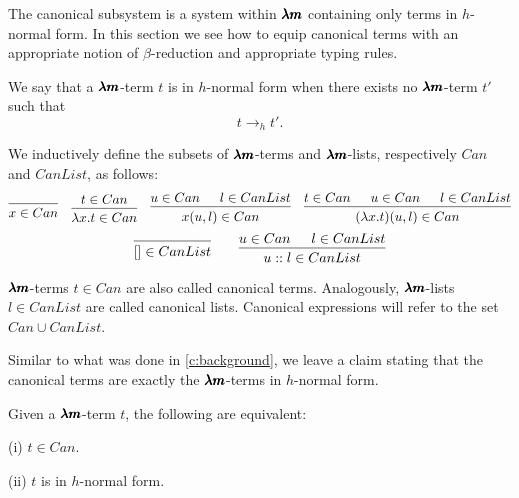 The canonical subsystem is a system within $\pmb{\lambda m}$ containing only terms in $h$-normal form.
In this section we see how to equip canonical terms with an appropriate notion of $\beta$-reduction and appropriate typing rules.

\begin{definition}
  We say that a $\pmb{\lambda m}$-term $t$ is in $h$-normal form when there exists no $\pmb{\lambda m}$-term $t'$ such that \[ t \to_h t' . \]
\end{definition}

\begin{definition}
  \label{canonical_terms}
  We inductively define the subsets of $\pmb{\lambda m}$-terms and $\pmb{\lambda m}$-lists, respectively $Can$ and $CanList$, as follows:
  \[
    \begin{prooftree}
      \infer0{ x \in Can } 
    \end{prooftree}
    \quad
    \begin{prooftree}
      \hypo{ t \in Can }
      \infer1{ \lambda x . t \in Can } 
    \end{prooftree}
    \quad
    \begin{prooftree}
      \hypo{ u \in Can }            
      \hypo{ l \in CanList }
      \infer2{ x(u, l) \in Can }
    \end{prooftree}
    \quad
    \begin{prooftree}
      \hypo{ t \in Can } 
      \hypo{ u \in Can }            
      \hypo{ l \in CanList }
      \infer3{ (\lambda x. t)(u, l) \in Can }
    \end{prooftree}
  \]
  \[
    \begin{prooftree}
      \infer0{ [] \in CanList } 
    \end{prooftree}
    \qquad
    \begin{prooftree}
      \hypo{ u \in Can }            
      \hypo{ l \in CanList }
      \infer2{ u::l \in CanList }
    \end{prooftree}
  \]

  $\pmb{\lambda m}$-terms $t \in Can$ are also called canonical terms.
  Analogously, $\pmb{\lambda m}$-lists $l \in CanList$ are called canonical lists.
  Canonical expressions will refer to the set $Can \cup CanList$.
\end{definition}

Similar to what was done in \cref{c:background}, we leave a claim stating that the canonical terms are exactly the $\pmb{\lambda m}$-terms in $h$-normal form.

\begin{claim}
  Given a $\pmb{\lambda m}$-term $t$, the following are equivalent:

  (i) $t \in Can$.

  (ii) $t$ is in $h$-normal form.
\end{claim}

